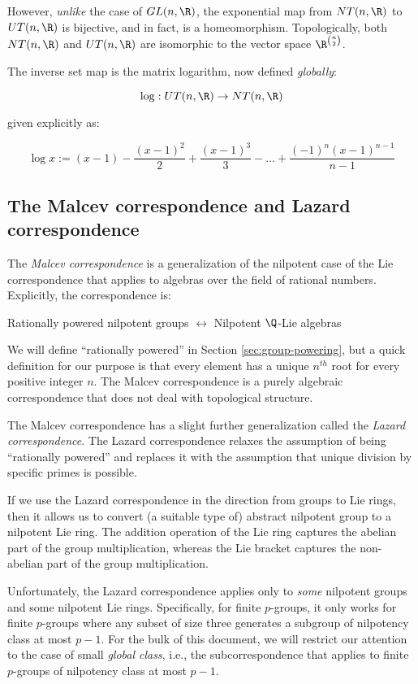\documentclass{ucetd}
\begin{document}
However, {\em unlike} the case of $GL(n,\R)$, the exponential map from
$NT(n,\R)$ to $UT(n,\R)$ is bijective, and in fact, is a
homeomorphism. Topologically, both $NT(n,\R)$ and $UT(n,\R)$ are
isomorphic to the vector space $\R^{\binom{n}{2}}$.

The inverse set map is the matrix logarithm, now defined {\em
  globally}:

$$\log: UT(n,\R) \to NT(n,\R)$$

given explicitly as:

$$\log x := (x - 1) - \frac{(x - 1)^2}{2} + \frac{(x - 1)^3}{3} - \dots + \frac{(-1)^n (x - 1)^{n-1}}{n - 1}$$

\subsection{The Malcev correspondence and Lazard correspondence}\label{sec:intro-malcev-and-lazard}

The {\em Malcev correspondence} is a generalization of the nilpotent
case of the Lie correspondence that applies to algebras over the field
of rational numbers. Explicitly, the correspondence is:

\begin{center}
  Rationally powered nilpotent groups $\leftrightarrow$ Nilpotent $\Q$-Lie algebras
\end{center}

We will define ``rationally powered'' in Section
\ref{sec:group-powering}, but a quick definition for our purpose is
that every element has a unique $n^{th}$ root for every positive
integer $n$. The Malcev correspondence is a purely algebraic
correspondence that does not deal with topological structure.

The Malcev correspondence has a slight further generalization called
the {\em Lazard correspondence}. The Lazard correspondence relaxes the
assumption of being ``rationally powered'' and replaces it with the
assumption that unique division by specific primes is possible.

If we use the Lazard correspondence in the direction from groups to
Lie rings, then it allows us to convert (a suitable type of) abstract
nilpotent group to a nilpotent Lie ring. The addition operation of the
Lie ring captures the abelian part of the group multiplication,
whereas the Lie bracket captures the non-abelian part of the group
multiplication.

Unfortunately, the Lazard correspondence applies only to {\em some}
nilpotent groups and some nilpotent Lie rings. Specifically, for
finite $p$-groups, it only works for finite $p$-groups where any
subset of size three generates a subgroup of nilpotency class at most
$p - 1$. For the bulk of this document, we will restrict our attention
to the case of small {\em global class}, i.e., the subcorrespondence
that applies to finite $p$-groups of nilpotency class at most $p - 1$.
\end{document}
